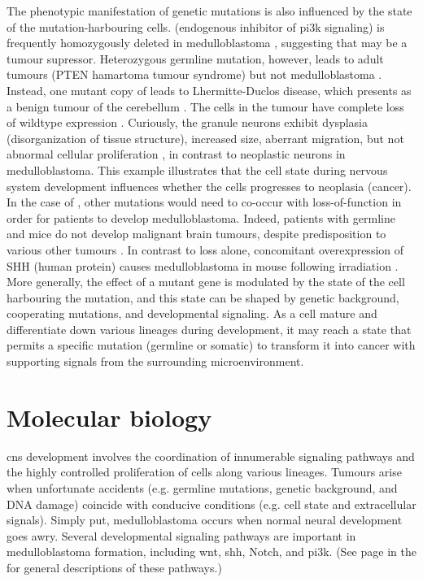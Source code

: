 The phenotypic manifestation of genetic mutations is also influenced by the state of the mutation-harbouring cells.  (endogenous inhibitor of \gls{pi3k} signaling) is frequently homozygously deleted in medulloblastoma , suggesting that  may be a tumour supressor. Heterozygous germline  mutation, however, leads to adult tumours (PTEN hamartoma tumour syndrome) but not medulloblastoma . Instead, one mutant copy of  leads to Lhermitte-Duclos disease, which presents as a benign tumour of the cerebellum . The cells in the tumour have complete loss of wildtype  expression . Curiously, the granule neurons exhibit dysplasia (disorganization of tissue structure), increased size, aberrant migration, but not abnormal cellular proliferation , in contrast to neoplastic neurons in medulloblastoma. This example illustrates that the cell state during nervous system development influences whether the cells progresses to neoplasia (cancer). In the case of , other mutations would need to co-occur with  loss-of-function in order for patients to develop medulloblastoma. Indeed, patients with germline  and \high{+/-} mice do not develop malignant brain tumours, despite predisposition to various other tumours . In contrast to  loss alone, concomitant overexpression of SHH (human protein) causes medulloblastoma in mouse following irradiation . More generally, the effect of a mutant gene is modulated by the state of the cell harbouring the mutation, and this state can be shaped by genetic background, cooperating mutations, and developmental signaling. As a cell mature and differentiate down various lineages during development, it may reach a state that permits a specific mutation (germline or somatic) to transform it into cancer with supporting signals from the surrounding microenvironment.


\section{Molecular biology}

\gls{cns} development involves the coordination of innumerable signaling pathways and the highly controlled proliferation of cells along various lineages. Tumours arise when unfortunate accidents (e.g. germline mutations, genetic background, and DNA damage) coincide with conducive conditions (e.g. cell state and extracellular signals). Simply put, medulloblastoma occurs when normal neural development goes awry. Several developmental signaling pathways are important in medulloblastoma formation, including \gls{wnt}, \gls{shh}, Notch, and \gls{pi3k}. (See page \pageref{sec:signal-pathways} in the  for general descriptions of these pathways.)

